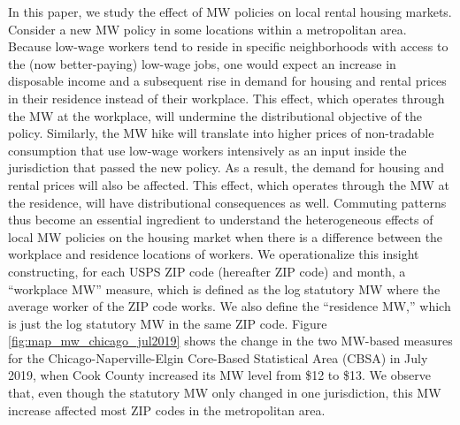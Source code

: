 In this paper, we study the effect of MW policies on local rental housing 
markets.
Consider a new MW policy in some locations within a metropolitan area.
Because low-wage workers tend to reside in specific neighborhoods with access 
to the (now better-paying) low-wage jobs,
one would expect an increase in disposable income and a subsequent rise in demand 
for housing and rental prices in their residence instead of their workplace.
This effect, which operates through the MW at the workplace, 
will undermine the distributional objective of the policy.
Similarly, the MW hike will translate into higher prices of non-tradable 
consumption that use low-wage workers intensively as an input inside the 
jurisdiction that passed the new policy.
As a result, the demand for housing and rental prices will also be affected.
This effect, which operates through the MW at the residence, will have 
distributional consequences as well.
Commuting patterns thus become an essential ingredient to understand the 
heterogeneous effects of local MW policies on the housing market when there 
is a difference between the workplace and residence locations of workers.
We operationalize this insight constructing, for each USPS ZIP code 
(hereafter ZIP code) and month,
a ``workplace MW'' measure, which is defined as the log statutory MW where
the average worker of the ZIP code works.
We also define the ``residence MW,'' which is just the log statutory MW in the
same ZIP code.
Figure \ref{fig:map_mw_chicago_jul2019} shows the change in the two MW-based 
measures for the Chicago-Naperville-Elgin Core-Based Statistical Area (CBSA) in 
July 2019, when Cook County increased its MW level from \$12 to \$13.
We observe that, even though the statutory MW only changed in one jurisdiction,
this MW increase affected most ZIP codes in the metropolitan area.


